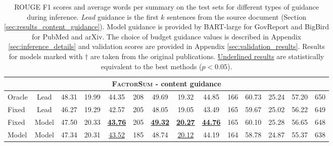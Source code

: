 \documentclass[11pt,table]{article}
\newcommand{\modelname}{FactorSum}
\begin{document}
\begin{table*}[h]
\begin{tabular}{lc|cccc|cccc|cccc}
    \midrule
    \multicolumn{14}{c}{\textbf{\textsc{\modelname} - content guidance}} \\
    \midrule
    Oracle & Lead & 48.31 & 19.99 & 44.35 & 208 & 49.69 & 19.32 & 44.85 & 166 & 60.73 & 25.24 & 57.20 & 650 \\
    Fixed & Lead & 46.27 & 19.29 & 42.57 & 205 & 48.05 & 19.05 & 43.49 & 165 & 59.67 & 25.02 & 56.22 & 649 \\
    Fixed & Model & 47.50 & 20.33 & \underline{\textbf{43.76}} & 205 & \underline{\textbf{49.32}} & \underline{\textbf{20.27}} & \underline{\textbf{44.76}} & 165 & 60.10 & 25.28 & 56.65 & 648 \\
    Model & Model & 47.34 & 20.31 & \underline{43.52} & 185 & 48.74 & \underline{20.12} & 44.19 & 164 & 58.78 & 24.87 & 55.37 & 638 \\
    \bottomrule
  \end{tabular}
  \caption{ROUGE F1 scores and average words per summary on the test sets for different types of guidance during inference. \emph{Lead} guidance is the first $k$ sentences from the source document (Section \ref{sec:results_content_guidance}). Model guidance is provided by BART-large for GovReport and BigBird for PubMed and arXiv. The choice of budget guidance values is described in Appendix \ref{sec:inference_details} and validation scores are provided in Appendix  \ref{sec:validation_results}. Results for models marked with $\dagger$ are taken from the original publications. \underline{Underlined results} are statistically  equivalent to the best methods ($p<0.05$).}\label{tab:experiment_results}
\end{table*}
\end{document}
